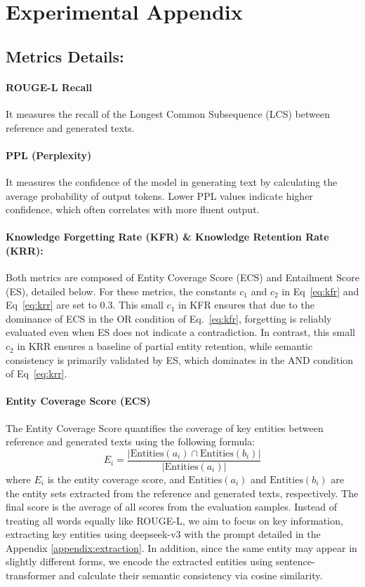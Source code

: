 \section{Experimental Appendix}
\label{sec:Experimental}
\subsection{Metrics Details:}
\label{section:metrics}
\paragraph{ROUGE-L Recall} It measures the recall of the Longest Common Subsequence (LCS) between reference and generated texts.

\paragraph{PPL (Perplexity)} It measures the confidence of the model in generating text by calculating the average probability of output tokens. Lower PPL values indicate higher confidence, which often correlates with more fluent output.

\paragraph{Knowledge Forgetting Rate (KFR) \& Knowledge Retention Rate (KRR):} Both metrics are composed of Entity Coverage Score (ECS) and Entailment Score (ES), detailed below.
For these metrics, the constants $c_1$ and $c_2$ in Eq~\eqref{eq:kfr} and Eq~\eqref{eq:krr} are set to 0.3.
This small $c_1$ in KFR ensures that due to the dominance of ECS in the OR condition of Eq.~\eqref{eq:kfr}, forgetting is reliably evaluated even when ES does not indicate a contradiction.
In contrast, this small $c_2$ in KRR ensures a baseline of partial entity retention, while semantic consistency is primarily validated by ES, which dominates in the AND condition of Eq~\eqref{eq:krr}.

\paragraph{Entity Coverage Score (ECS)} The Entity Coverage Score quantifies the coverage of key entities between reference and generated texts using the following formula:
\begin{equation}
E_i = \frac{|\text{Entities}(a_i) \cap \text{Entities}(b_i)|}{|\text{Entities}(a_i)|}
\end{equation}
where \(E_i\) is the entity coverage score, and \(\text{Entities}(a_i)\) and \(\text{Entities}(b_i)\) are the entity sets extracted from the reference and generated texts, respectively.
The final score is the average of all scores from the evaluation samples.
Instead of treating all words equally like ROUGE-L, we aim to focus on key information, extracting key entities using deepseek-v3 with the prompt detailed in the Appendix \ref{appendix:extraction}.
In addition, since the same entity may appear in slightly different forms, we encode the extracted entities using sentence-transformer \citep{reimers2019sentencebertsentenceembeddingsusing} and calculate their semantic consistency via cosine similarity.

